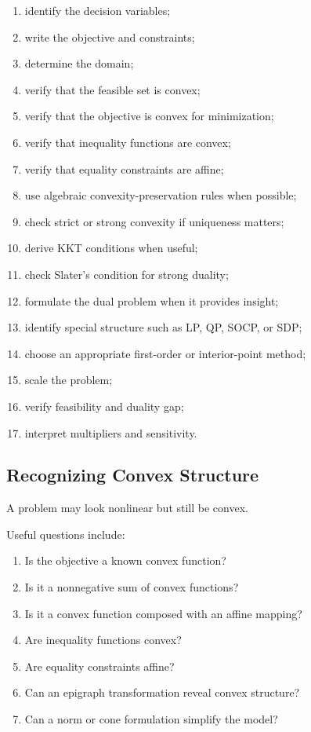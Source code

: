 \begin{enumerate}
    \item identify the decision variables;
    \item write the objective and constraints;
    \item determine the domain;
    \item verify that the feasible set is convex;
    \item verify that the objective is convex for minimization;
    \item verify that inequality functions are convex;
    \item verify that equality constraints are affine;
    \item use algebraic convexity-preservation rules when possible;
    \item check strict or strong convexity if uniqueness matters;
    \item derive KKT conditions when useful;
    \item check Slater's condition for strong duality;
    \item formulate the dual problem when it provides insight;
    \item identify special structure such as LP, QP, SOCP, or SDP;
    \item choose an appropriate first-order or interior-point method;
    \item scale the problem;
    \item verify feasibility and duality gap;
    \item interpret multipliers and sensitivity.
\end{enumerate}

\subsection{Recognizing Convex Structure}
\label{subsec:recognizing-convex-structure}

A problem may look nonlinear but still be convex.

Useful questions include:

\begin{enumerate}
    \item Is the objective a known convex function?
    \item Is it a nonnegative sum of convex functions?
    \item Is it a convex function composed with an affine mapping?
    \item Are inequality functions convex?
    \item Are equality constraints affine?
    \item Can an epigraph transformation reveal convex structure?
    \item Can a norm or cone formulation simplify the model?
\end{enumerate}

